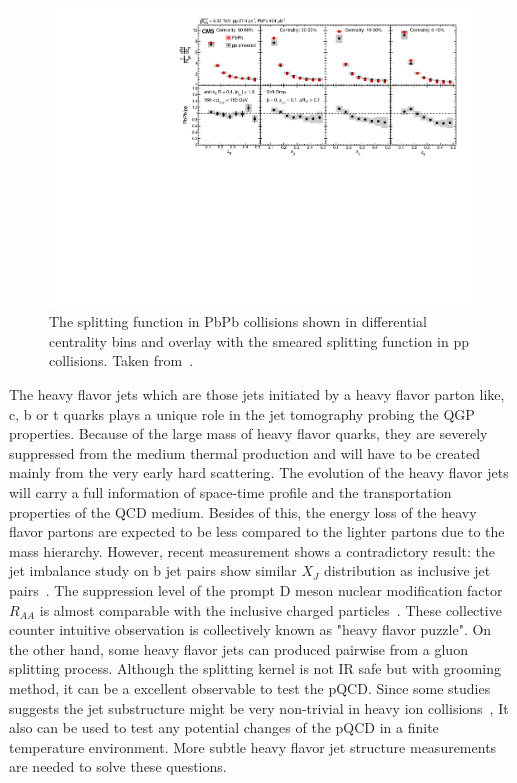 \begin{figure}[ht]
  \begin{center}
    \includegraphics[width=1\textwidth]{figures/introduction/CMS-HIN-16-006_Figure_003.pdf}
  \end{center}
  \caption{The splitting function in PbPb collisions shown in differential centrality bins and overlay with the smeared splitting function in pp collisions. Taken from~\cite{Sirunyan:2017bsd,}.}
  \label{fig:splitting_function}
\end{figure}

The heavy flavor jets which are those jets initiated by a heavy flavor parton like, c, b or t quarks plays a unique role in the jet tomography probing the QGP properties. Because of the large mass of heavy flavor quarks, they are severely suppressed from the medium thermal production and will have to be created mainly from the very early hard scattering. The evolution of the heavy flavor jets will carry a full information of space-time profile and the transportation properties of the QCD medium. Besides of this, the energy loss of the heavy flavor partons are expected to be less compared to the lighter partons due to the mass hierarchy. However, recent measurement shows a contradictory result: the jet imbalance study on b jet pairs show similar $X_J$ distribution as inclusive jet pairs~\cite{Sirunyan:2018jju}. The suppression level of the prompt D meson nuclear modification factor $R_{AA}$ is almost comparable with the inclusive charged particles~\cite{Sirunyan:2017xss}. These collective counter intuitive observation is collectively known as "heavy flavor puzzle". On the other hand, some heavy flavor jets can produced pairwise from a gluon splitting process. Although the splitting kernel is not IR safe but with grooming method, it can be a excellent observable to test the pQCD. Since some studies suggests the jet substructure might be very non-trivial in heavy ion collisions~\cite{Li:2017wwc}, It also can be used to test any potential changes of the pQCD in a finite temperature environment. More subtle heavy flavor jet structure measurements are needed to solve these questions. 